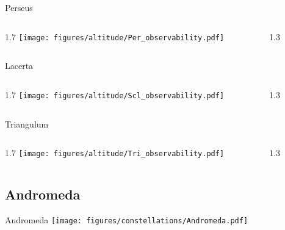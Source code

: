 \documentclass[final]{beamer}
\newlength{\colwidth}
\begin{document}
\begin{frame}[t]{}
  \Large{Perseus}
  \begin{columns}[T]
    \begin{column}{1.7\colwidth}
      \centering
      \texttt{[image: figures/altitude/Per\_observability.pdf]}
    \end{column}
    \begin{column}{1.3\colwidth}
      \Large
      
    \end{column}
  \end{columns}

  \Large{Lacerta}
  \begin{columns}[T]
    \begin{column}{1.7\colwidth}
      \centering
      \texttt{[image: figures/altitude/Scl\_observability.pdf]}
    \end{column}
    \begin{column}{1.3\colwidth}
      \Large
      
    \end{column}
  \end{columns}

  \Large{Triangulum}
  \begin{columns}[T]
    \begin{column}{1.7\colwidth}
      \centering
      \texttt{[image: figures/altitude/Tri\_observability.pdf]}
    \end{column}
    \begin{column}{1.3\colwidth}
      \Large
      
    \end{column}
  \end{columns}
\end{frame}

\subsection{Andromeda}

\begin{frame}[t]{\LARGE Andromeda}
  \centering
  \texttt{[image: figures/constellations/Andromeda.pdf]}
\end{frame}

\end{document}
